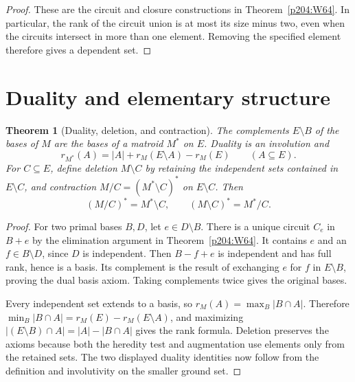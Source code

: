 \documentclass[11pt,oneside,openany]{book}
\theoremstyle{plain}
\newtheorem{theorem}{Theorem}[chapter]
\theoremstyle{definition}
\theoremstyle{remark}
\begin{document}
\begin{proof}
These are the circuit and closure constructions in
Theorem~\ref{p204:W64}. In particular, the rank of the circuit
union is at most its size minus two, even when the circuits
intersect in more than one element. Removing the specified
element therefore gives a dependent set.
\end{proof}

\section{Duality and elementary structure}

\begin{theorem}[Duality, deletion, and contraction]
\label{p204:W67}
The complements \(E\setminus B\) of the bases of \(M\) are the
bases of a matroid \(M^*\) on \(E\). Duality is an involution and
\[
 r_{M^*}(A)=|A|+r_M(E\setminus A)-r_M(E)
 \qquad (A\subseteq E).
\]
For \(C\subseteq E\), define deletion \(M\setminus C\) by
retaining the independent sets contained in \(E\setminus C\),
and contraction \(M/C=(M^*\setminus C)^*\) on \(E\setminus C\).
Then
\[
 (M/C)^*=M^*\setminus C,\qquad
 (M\setminus C)^*=M^*/C.
\]
\end{theorem}

\begin{proof}
For two primal bases \(B,D\), let \(e\in D\setminus B\).
There is a unique circuit \(C_e\) in \(B+e\) by the elimination
argument in Theorem~\ref{p204:W64}. It contains \(e\) and an
\(f\in B\setminus D\), since \(D\) is independent. Then
\(B-f+e\) is independent and has full rank, hence is a basis.
Its complement is the result of exchanging \(e\) for \(f\)
in \(E\setminus B\), proving the dual basis axiom. Taking
complements twice gives the original bases.

Every independent set extends to a basis, so
\(r_M(A)=\max_B|B\cap A|\). Therefore
\(\min_B|B\cap A|=r_M(E)-r_M(E\setminus A)\), and maximizing
\(|(E\setminus B)\cap A|=|A|-|B\cap A|\) gives the rank formula.
Deletion preserves the axioms because both the heredity test
and augmentation use elements only from the retained sets.
The two displayed duality identities now follow from the
definition and involutivity on the smaller ground set.
\end{proof}
\end{document}
